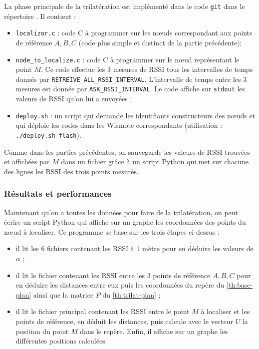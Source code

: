 \documentclass[french, a4paper, 12pt, parskip]{scrartcl}
\begin{document}
La phase principale de la trilatération est implémenté dans le code \verb+git+
dans le répertoire . Il contient :
\begin{itemize}
  \item \verb+localizor.c+ : code C à programmer sur les nœuds correspondant
    aux points de référence $A, B, C$ (code plus simple et distinct de la
    partie précédente);
  \item \verb+node_to_localize.c+ : code C à programmer sur le nœud
    représentant le point $M$. Ce code effectue les 3 mesures de RSSI tous les
    intervalles de temps donnés par \verb+RETREIVE_ALL_RSSI_INTERVAL+.
    L'intervalle de temps entre les 3 mesures est donnée par
    \verb+ASK_RSSI_INTERVAL+. Le code affiche sur \verb+stdout+ les valeurs de
    RSSI qu'on lui a envoyées ;
  \item \verb+deploy.sh+ : un script qui demande les identifiants constructeurs
    des nœuds et qui déploie les codes dans les Wismote correspondants
    (utilisation : \verb+./deploy.sh flash+).
\end{itemize}

Comme dans les parties précédentes, on sauvegarde les valeurs de RSSI trouvées
et affichées par $M$ dans un fichier grâce à un script Python
 qui met sur chacune des lignes les RSSI des
trois points mesurés.

\subsubsection{Résultats et performances}

Maintenant qu'on a toutes les données pour faire de la trilatération, on peut
écrire un script Python qui affiche sur un graphe les coordonnées des points du
nœud à localiser. Ce programme se base sur les trois étapes ci-dessus :
\begin{itemize}
  \item il lit les 6 fichiers contenant les RSSI à $1$ mètre pour en déduire
    les valeurs de $\alpha$ ;
  \item il lit le fichier contenant les RSSI entre les 3 points de référence
    $A, B, C$ pour en déduire les distances entre eux puis les coordonnées du
    repère du \autoref{th:base-plan} ainsi que la matrice $P$ du
    \autoref{th:trilat-plan} ;
  \item il lit le fichier principal contenant les RSSI entre le point $M$ à
    localiser et les points de référence, en déduit les distances, puis calcule
    avec le vecteur $U$ la position du point $M$ dans le repère. Enfin, il
    affiche sur un graphe les différentes positions calculées.
\end{itemize}
\end{document}
